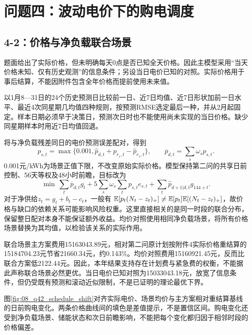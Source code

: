 \section{问题四：波动电价下的购电调度}
\subsection{4-2：价格与净负载联合场景}
题面给出了实际价格，但未明确每天0点是否已知全天价格。因此主模型采用“当天价格未知、仅有历史观测”的信息条件；另设当日电价已知的对照。实际价格用于事后结算，不能因附件包含全年价格而提前使用未来值。

以1月8—31日的24个历史预测日比较前一日、近7日均值、近7日形状加前一日水平、最近4次同星期几均值四种规则，按预测RMSE选定最后一种，并从2月起固定。样本日期必须早于决策日，预测次日时也不能使用尚未实现的当日价格。缺少同星期样本时用近7日均值回退。

将与净负载残差同日的电价预测误差配对，得到
\begin{equation}
p_{s,t}=\max\{0.001,\widehat p_{d,t}+p_{r_s,t}-\widehat p_{r_s,t}\},\qquad
\overline p_{d,t}=\sum_s\omega_s p_{s,t}.
\end{equation}
0.001元/kWh为场景正值下限，不改变原始实际价格。模型保持第二问的共享日前控制、56天等权及48小时前瞻，目标改为
\begin{equation}
\min\ \sum_t\overline p_{d,t}g_t+
5\sum_s\omega_s\sum_t p_{s,t}e_{s,t}+
\sum_t\widehat p_{d+1|d,t}g_{144+t}.\label{eq:q42}
\end{equation}
对于净供给$z_t=g_t+b_t-c_t$，一般有
$\mathbb{E}[p_t(N_t-z_t)_+]\ne\mathbb{E}[p_t]\mathbb{E}[(N_t-z_t)_+]$，故价格与缺口的依赖关系可能影响风险权重。这里直接相关的是同一时段的联合分布，保留整日配对本身不能保证额外收益。均价对照使用相同净负载场景，将所有价格场景替换为其均值，以检验该关系的实际作用。


联合场景主方案费用15163043.89元，相对第二问原计划按附件4实际价格重结算的15184704.23元节省21660.34元，约0.143\%。均价对照费用15160921.45元，反而比联合方案低2122.44元。因此，本年结果支持存在计划费与紧急费的权衡，不能据此声称联合场景必然更优。当日电价已知对照为15033043.18元，放宽了信息条件，但仍受既有预测和滚动近似限制，不是已证明的理论最优下界。

图\ref{fig:08_q42_schedule_shift}对齐实际电价、场景均价与主方案相对重结算基线的日前购电变化。两条价格曲线间的填色是差值提示，不是置信区间。购电变化还受到净负载场景、储能状态和次日前瞻影响，不能把每个变化都归因于相邻时段的价格偏差。
\FloatBarrier

